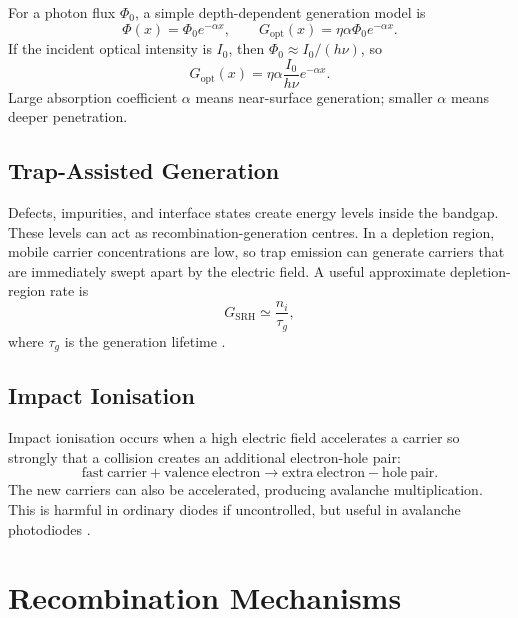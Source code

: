 \documentclass[11pt,a4paper]{article}
\newcommand{\nint}{n_i}
\begin{document}
For a photon flux \(\Phi_0\), a simple depth-dependent generation model is
\begin{equation}
  \Phi(x)=\Phi_0e^{-\alpha x},\qquad
  G_{\mathrm{opt}}(x)=\eta\alpha\Phi_0e^{-\alpha x}.
\end{equation}
If the incident optical intensity is \(I_0\), then \(\Phi_0\approx I_0/(h\nu)\), so
\begin{equation}
  G_{\mathrm{opt}}(x)=\eta\alpha\frac{I_0}{h\nu}e^{-\alpha x}.
\end{equation}
Large absorption coefficient \(\alpha\) means near-surface generation; smaller \(\alpha\) means deeper penetration.

\subsection{Trap-Assisted Generation}

Defects, impurities, and interface states create energy levels inside the bandgap. These levels can act as recombination-generation centres. In a depletion region, mobile carrier concentrations are low, so trap emission can generate carriers that are immediately swept apart by the electric field. A useful approximate depletion-region rate is
\begin{equation}
  G_{\mathrm{SRH}}\simeq \frac{\nint}{\tau_g},
\end{equation}
where \(\tau_g\) is the generation lifetime \cite{shockley1952,hall1952,sze2007}.

\subsection{Impact Ionisation}

Impact ionisation occurs when a high electric field accelerates a carrier so strongly that a collision creates an additional electron-hole pair:
\begin{equation}
  \mathrm{fast\ carrier}+\mathrm{valence\ electron}
  \rightarrow \mathrm{extra\ electron-hole\ pair}.
\end{equation}
The new carriers can also be accelerated, producing avalanche multiplication. This is harmful in ordinary diodes if uncontrolled, but useful in avalanche photodiodes \cite{entner2007,sze2007}.

\section{Recombination Mechanisms}
\end{document}

